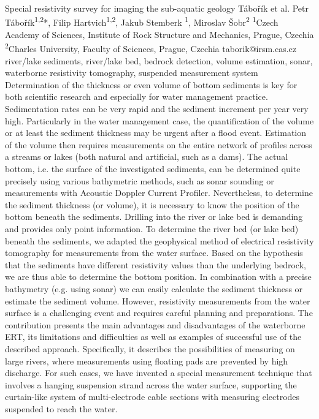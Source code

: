 \abstract
{Special resistivity survey for imaging the sub-aquatic geology} 
{Tábořík et al.} 
{Petr Tábořík\textsuperscript{1,2}*, Filip Hartvich\textsuperscript{1,2}, Jakub Stemberk	\textsuperscript{1}, Miroslav Šobr\textsuperscript{2}} 
{\TLtag} 
{
	\textsuperscript{1}Czech Academy of Sciences, Institute of Rock Structure and Mechanics, Prague, Czechia
	\textsuperscript{2}Charles University, Faculty of Sciences, Prague, Czechia
}
{taborik@irsm.cas.cz}  %
{river/lake sediments, river/lake bed, bedrock detection, volume estimation, sonar, waterborne resistivity tomography, suspended measurement system}
{
Determination of the thickness or even volume of bottom sediments is key for both scientific research and especially for water management practice. Sedimentation rates can be very rapid and the sediment increment per year very high. Particularly in the water management case, the quantification of the volume or at least the sediment thickness may be urgent after a flood event. Estimation of the volume then requires measurements on the entire network of profiles across a streams or lakes (both natural and artificial, such as a dams). The actual bottom, i.e. the surface of the investigated sediments, can be determined quite precisely using various bathymetric methods, such as sonar sounding or measurements with Acoustic Doppler Current Profiler. Nevertheless, to determine the sediment thickness (or volume), it is necessary to know the position of the bottom beneath the sediments. Drilling into the river or lake bed is demanding and provides only point information. To determine the river bed (or lake bed) beneath the sediments, we adapted the geophysical method of electrical resistivity tomography for measurements from the water surface. Based on the hypothesis that the sediments have different resistivity values than the underlying bedrock, we are thus able to determine the bottom position. In combination with a precise bathymetry (e.g. using sonar) we can easily calculate the sediment thickness or estimate the sediment volume. However, resistivity measurements from the water surface is a challenging event and requires careful planning and preparations. The contribution presents the main advantages and disadvantages of the waterborne ERT, its limitations and difficulties as well as examples of successful use of the described approach. Specifically, it describes the possibilities of measuring on large rivers, where measurements using floating pads are prevented by high discharge. For such cases, we have invented a special measurement technique that involves a hanging suspension strand across the water surface, supporting the curtain-like system of multi-electrode cable sections with measuring electrodes suspended to reach the water.
}
{
}

